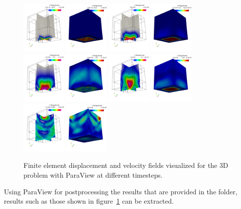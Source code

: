 {{\begin{figure}[h!]
	\centering
	\includegraphics[width=0.4\textwidth]{./Images/sd-3du0.png}
	\includegraphics[width=0.4\textwidth]{./Images/sd-3du1.png}\\
	\includegraphics[width=0.4\textwidth]{./Images/sd-3du2.png}
	\includegraphics[width=0.4\textwidth]{./Images/sd-3du3.png}\\
	\includegraphics[width=0.4\textwidth]{./Images/sd-3du4.png}
	\caption{Finite element displacement and velocity fields visualized for the 3D problem with ParaView at different timesteps. \label{bar3d-sd}}
\end{figure}

Using ParaView for postprocessing the results that are provided in the  folder, results such as those shown in figure~\ref{bar3d-sd} can be extracted.

}}
